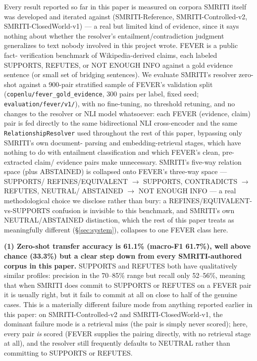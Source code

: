 

Every result reported so far in this paper is measured on corpora
SMRITI itself was developed and iterated against (SMRITI-Reference,
SMRITI-Controlled-v2, SMRITI-ClosedWorld-v1) --- a real but limited kind
of evidence, since it says nothing about whether the resolver's
entailment/contradiction judgment generalizes to text nobody involved in
this project wrote. FEVER \citep{thorne2018fever} is a public fact-
verification benchmark of Wikipedia-derived claims, each labeled
SUPPORTS, REFUTES, or NOT ENOUGH INFO against a gold evidence sentence
(or small set of bridging sentences). We evaluate SMRITI's resolver
zero-shot against a 900-pair stratified sample of FEVER's validation
split (\texttt{copenlu/fever\_gold\_evidence}, 300 pairs per label, fixed
seed; \texttt{evaluation/fever/v1/}), with no fine-tuning, no threshold
retuning, and no changes to the resolver or NLI model whatsoever: each
FEVER (evidence, claim) pair is fed directly to the same bidirectional
NLI cross-encoder and the same \texttt{RelationshipResolver} used
throughout the rest of this paper, bypassing only SMRITI's own document-
parsing and embedding-retrieval stages, which have nothing to do with
entailment classification and which FEVER's clean, pre-extracted claim/
evidence pairs make unnecessary. SMRITI's five-way relation space (plus
ABSTAINED) is collapsed onto FEVER's three-way space --- SUPPORTS/
REFINES/EQUIVALENT $\to$ SUPPORTS, CONTRADICTS $\to$ REFUTES, NEUTRAL/
ABSTAINED $\to$ NOT ENOUGH INFO --- a real methodological choice we
disclose rather than bury: a REFINES/EQUIVALENT-vs-SUPPORTS confusion is
invisible to this benchmark, and SMRITI's own NEUTRAL/ABSTAINED
distinction, which the rest of this paper treats as meaningfully
different (\S\ref{sec:system}), collapses to one FEVER class here.

\textbf{(1) Zero-shot transfer accuracy is 61.1\% (macro-F1 61.7\%),
well above chance (33.3\%) but a clear step down from every
SMRITI-authored corpus in this paper.} SUPPORTS and REFUTES both have
qualitatively similar profiles: precision in the 70--85\% range but
recall only 52--56\%, meaning that when SMRITI does commit to SUPPORTS
or REFUTES on a FEVER pair it is usually right, but it fails to commit
at all on close to half of the genuine cases. This is a materially
different failure mode from anything reported earlier in this paper: on
SMRITI-Controlled-v2 and SMRITI-ClosedWorld-v1, the dominant failure
mode is a retrieval miss (the pair is simply never scored); here, every
pair \emph{is} scored (FEVER supplies the pairing directly, with no
retrieval stage at all), and the resolver still frequently defaults to
NEUTRAL rather than committing to SUPPORTS or REFUTES.

